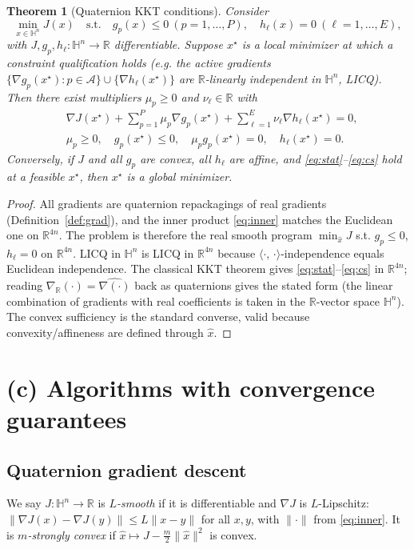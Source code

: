 \documentclass{amsart}
\newtheorem{theorem}{Theorem}
\theoremstyle{definition}
\newcommand{\HH}{\mathbb{H}}
\newcommand{\RR}{\mathbb{R}}
\newcommand{\inner}[2]{\langle #1,\,#2\rangle}
\begin{document}
\begin{theorem}[Quaternion KKT conditions]
\label{thm:kkt}
Consider
\[
\min_{x\in\HH^n} J(x)\quad\text{s.t.}\quad
g_p(x)\le0\ (p=1,\dots,P),\quad h_\ell(x)=0\ (\ell=1,\dots,E),
\]
with $J,g_p,h_\ell\colon\HH^n\to\RR$ differentiable. Suppose
$x^\star$ is a local minimizer at which a constraint qualification
holds \textup{(}e.g. the active gradients
$\{\nabla g_p(x^\star):p\in\mathcal A\}\cup\{\nabla h_\ell(x^\star)\}$
are $\RR$-linearly independent in $\HH^n$, LICQ\textup{)}. Then there
exist multipliers $\mu_p\ge0$ and $\nu_\ell\in\RR$ with
\begin{align}
&\nabla J(x^\star)+\sum_{p=1}^P\mu_p\nabla g_p(x^\star)
+\sum_{\ell=1}^E\nu_\ell\nabla h_\ell(x^\star)=0,\label{eq:stat}\\
&\mu_p\ge0,\quad g_p(x^\star)\le0,\quad \mu_p g_p(x^\star)=0,\quad
h_\ell(x^\star)=0.\label{eq:cs}
\end{align}
Conversely, if $J$ and all $g_p$ are convex, all $h_\ell$ are affine,
and \eqref{eq:stat}--\eqref{eq:cs} hold at a feasible $x^\star$, then
$x^\star$ is a global minimizer.
\end{theorem}

\begin{proof}
All gradients are quaternion repackagings of real gradients
(Definition~\ref{def:grad}), and the inner product \eqref{eq:inner}
matches the Euclidean one on $\RR^{4n}$. The problem is therefore the
real smooth program
$\min_{\widehat x} J$ s.t. $g_p\le0$, $h_\ell=0$ on $\RR^{4n}$. LICQ in
$\HH^n$ is LICQ in $\RR^{4n}$ because $\inner{\cdot}{\cdot}$-independence
equals Euclidean independence. The classical KKT theorem gives
\eqref{eq:stat}--\eqref{eq:cs} in $\RR^{4n}$; reading
$\nabla_\RR(\cdot)=\widehat{\nabla(\cdot)}$ back as quaternions gives the
stated form (the linear combination of gradients with real coefficients
is taken in the $\RR$-vector space $\HH^n$). The convex sufficiency is
the standard converse, valid because convexity/affineness are defined
through $\widehat x$.
\end{proof}

\section{(c) Algorithms with convergence guarantees}
\label{sec:c}

\subsection{Quaternion gradient descent}
We say $J\colon\HH^n\to\RR$ is \emph{$L$-smooth} if it is differentiable
and $\nabla J$ is $L$-Lipschitz:
$\|\nabla J(x)-\nabla J(y)\|\le L\|x-y\|$ for all $x,y$, with $\|\cdot\|$
from \eqref{eq:inner}. It is \emph{$m$-strongly convex} if
$\widehat x\mapsto J-\tfrac m2\|\widehat x\|^2$ is convex.
\end{document}
